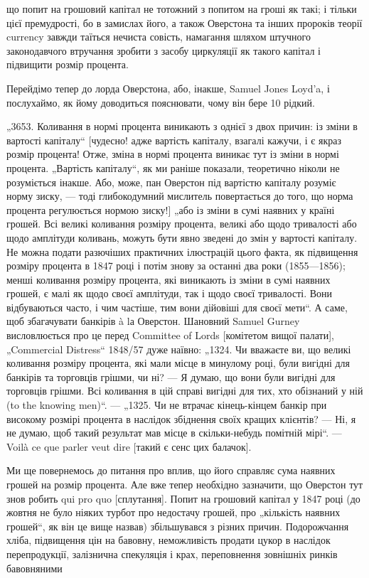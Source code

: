 що попит на грошовий капітал не тотожний з попитом на гроші
як такі; і тільки цієї премудрості, бо в замислах його, а також
Оверстона та інших пророків теорії currency завжди таїться нечиста совість, намагання шляхом
штучного законодавчого втручання зробити з засобу циркуляції як такого капітал і підвищити
розмір процента.

Перейдімо тепер до лорда Оверстона, або, інакше, Samuel
Jones Loyd’a, і послухаймо, як йому доводиться пояснювати, чому
він бере 10%
рідкий.

„3653. Коливання в нормі процента виникають з однієї з двох
причин: із зміни в вартості капіталу“ [чудесно! адже вартість
капіталу, взагалі кажучи, і є якраз розмір процента! Отже, зміна
в нормі процента виникає тут із зміни в нормі процента. „Вартість капіталу“, як ми раніше показали,
теоретично ніколи не
розуміється інакше. Або, може, пан Оверстон під вартістю
капіталу розуміє норму зиску, — тоді глибокодумний мислитель
повертається до того, що норма процента регулюється нормою
зиску!] „або із зміни в сумі наявних у країні грошей. Всі великі
коливання розміру процента, великі або щодо тривалості або
щодо амплітуди коливань, можуть бути явно зведені до змін
у вартості капіталу. Не можна подати разючіших практичних ілюстрацій цього факта, як підвищення
розміру процента в 1847 році
і потім знову за останні два роки (1855—1856); менші коливання
розміру процента, які виникають із зміни в сумі наявних грошей,
є малі як щодо своєї амплітуди, так і щодо своєї тривалості. Вони
відбуваються часто, і чим частіше, тим вони дійовіші для своєї
мети“. А саме, щоб збагачувати банкірів à lа Оверстон. Шановний Samuel Gurney висловлюється про це
перед Committee of
Lords [комітетом вищої палати], „Commercial Distress“ 1848/57 дуже
наївно: „1324. Чи вважаєте ви, що великі коливання розміру
процента, які мали місце в минулому році, були вигідні для
банкірів та торговців грішми, чи ні? — Я думаю, що вони були
вигідні для торговців грішми. Всі коливання в цій справі вигідні
для тих, хто обізнаний у ній (to the knowing men)“. — „1325. Чи не
втрачає кінець-кінцем банкір при високому розмірі процента
в наслідок збіднення своїх кращих клієнтів? — Ні, я не думаю,
щоб такий результат мав місце в скільки-небудь помітній мірі“. — Voilà ce que parler veut dire
[такий є сенс цих балачок].

Ми ще повернемось до питання про вплив, що його справляє
сума наявних грошей на розмір процента. Але вже тепер необхідно зазначити, що Оверстон тут знов
робить qui pro quo [сплутання]. Попит на грошовий капітал у 1847 році (до жовтня не
було ніяких турбот про недостачу грошей, про „кількість
наявних грошей“, як він це вище назвав) збільшувався з різних
причин. Подорожчання хліба, підвищення цін на бавовну, неможливість продати цукор в наслідок
перепродукції, залізнична
спекуляція і крах, переповнення зовнішніх ринків бавовняними
